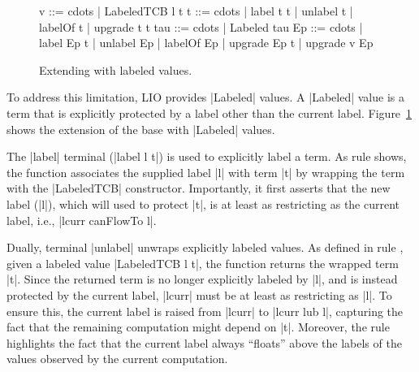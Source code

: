 \begin{figure}[t] %
\small
\begin{code}
v    ::= cdots  | LabeledTCB l t
t    ::= cdots  | label t t | unlabel t | labelOf t | upgrade t t
tau  ::= cdots  | Labeled tau
Ep   ::= cdots  | label Ep t | unlabel Ep | labelOf Ep
                | upgrade Ep t | upgrade v Ep
\end{code}

\caption{Extending \lio{} with labeled values\label{fig:sos:labeled}.}
\end{figure}

 
To address this limitation, LIO provides |Labeled| values.
%
A |Labeled| value is a term that is explicitly protected by a label
other than the current label.
%
%
Figure~\ref{fig:sos:labeled} shows the extension of the base \lio{}
with |Labeled| values.

The |label| terminal (|label l t|) is used to explicitly label a term.
%
As rule  shows, the function associates the supplied
label |l| with term |t| by wrapping the term with the |LabeledTCB|
constructor.
%
Importantly, it first asserts that the new label (|l|), which will
used to protect |t|, is at least as restricting as the current label,
i.e., |lcurr canFlowTo l|.
 
Dually, terminal |unlabel| unwraps explicitly labeled values.
%
As defined in rule , given a labeled value
|LabeledTCB l t|, the function returns the wrapped term |t|.
%
Since the returned term is no longer explicitly labeled by |l|, and
is instead protected by the current label, |lcurr| must be at least
as restricting as |l|.
%
To ensure this, the current label is raised from |lcurr| to |lcurr lub
l|, capturing the fact that the remaining computation might depend on
|t|. 
%
Moreover, the rule highlights the fact that the current label always
``floats'' above the labels of the values observed by the current
computation.

